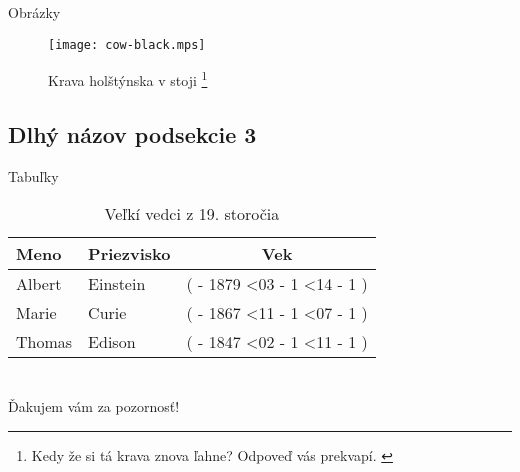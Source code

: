 \documentclass[
]{beamer}
\begin{document}
\begin{frame}{Obrázky}
\begin{figure}
  \texttt{[image: cow-black.mps]}
  \caption{Krava holštýnska v stoji%
    \footnote{%
      Kedy že si tá krava znova ľahne?
      Odpoveď vás prekvapí.
      \cite{tolkamp10cows}
    }%
  }
\end{figure}
\end{frame}

\subsection[Názov podsekcie 3]{Dlhý názov podsekcie 3}

\def\age(#1-#2-#3){%
  \the\numexpr(
    \year - #1
    \ifnum\month<#2
      - 1
    \else
      \ifnum\month=#2
        \ifnum\day<#3
          - 1
        \fi
      \fi
    \fi
  )%
}

\begin{frame}{Tabuľky}
\begin{table}
  \begin{tabular}{llc}
    Meno & Priezvisko & Vek \\ \midrule
    Albert & Einstein & \age(1879-03-14) \\
    Marie & Curie & \age(1867-11-07) \\
    Thomas & Edison & \age(1847-02-11) \\
  \end{tabular}
  \caption{Veľkí vedci z 19. storočia}
\end{table}
\end{frame}

\section{\bibname}
\begin{frame}[t, allowframebreaks]{\bibname}
\printbibliography[heading=none]
\end{frame}

\begin{frame}[plain]
\vfill
\centerline{Ďakujem vám za pozornosť!}
\vfill\vfill
\end{frame}

\makeoutro
\end{document}
